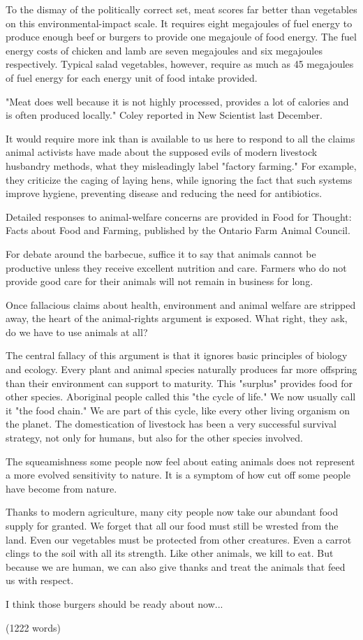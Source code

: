 \documentclass[a4paper]{article}
\begin{document}
 To the dismay of the politically correct set, meat scores far better than vegetables on this environmental-impact scale. It requires eight megajoules of fuel energy to produce enough beef or burgers to provide one megajoule of food energy. The fuel energy costs of chicken and lamb are seven megajoules and six megajoules respectively. Typical salad vegetables, however, require as much as 45 megajoules of fuel energy for each energy unit of food intake provided.

"Meat does well because it is not highly processed, provides a lot of calories and is often produced locally." Coley reported in New Scientist last December.

It would require more ink than is available to us here to respond to all the claims animal activists have made about the supposed evils of modern livestock husbandry methods, what they misleadingly label "factory farming." For example, they criticize the caging of laying hens, while ignoring the fact that such systems improve hygiene, preventing disease and reducing the need for antibiotics.

Detailed responses to animal-welfare concerns are provided in Food for Thought: Facts about Food and Farming, published by the Ontario Farm Animal Council.

For debate around the barbecue, suffice it to say that animals cannot be productive unless they receive excellent nutrition and care. Farmers who do not provide good care for their animals will not remain in business for long.

 Once fallacious claims about health, environment and animal welfare are stripped away, the heart of the animal-rights argument is exposed. What right, they ask, do we have to use animals at all?

The central fallacy of this argument is that it ignores basic principles of biology and ecology. Every plant and animal species naturally produces far more offspring than their environment can support to maturity. This "surplus" provides food for other species. Aboriginal people called this "the cycle of life." We now usually call it "the food chain." We are part of this cycle, like every other living organism on the planet. The domestication of livestock has been a very successful survival strategy, not only for humans, but also for the other species involved.

The squeamishness some people now feel about eating animals does not represent a more evolved sensitivity to nature. It is a symptom of how cut off some people have become from nature.

Thanks to modern agriculture, many city people now take our abundant food supply for granted. We forget that all our food must still be wrested from the land. Even our vegetables must be protected from other creatures. Even a carrot clings to the soil with all its strength. Like other animals, we kill to eat. But because we are human, we can also give thanks and treat the animals that feed us with respect.

I think those burgers should be ready about now...

(1222 words)



\end{document}
